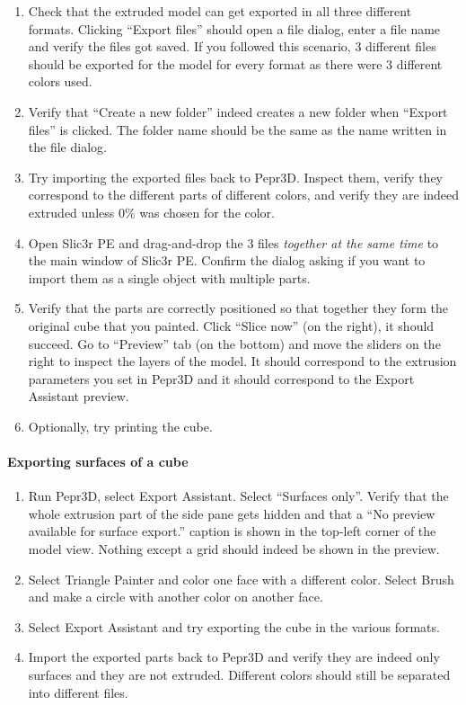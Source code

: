 \begin{enumerate}
\item Check that the extruded model can get exported in all three different formats. Clicking ``Export files'' should open a file dialog, enter a file name and verify the files got saved. If you followed this scenario, 3 different files should be exported for the model for every format as there were 3 different colors used.
\item Verify that ``Create a new folder'' indeed creates a new folder when ``Export files'' is clicked. The folder name should be the same as the name written in the file dialog.
\item Try importing the exported files back to Pepr3D. Inspect them, verify they correspond to the different parts of different colors, and verify they are indeed extruded unless $0\%$ was chosen for the color.
\item Open Slic3r PE and drag-and-drop the 3 files \emph{together at the same time} to the main window of Slic3r PE. Confirm the dialog asking if you want to import them as a single object with multiple parts.
\item Verify that the parts are correctly positioned so that together they form the original cube that you painted. Click ``Slice now'' (on the right), it should succeed. Go to ``Preview'' tab (on the bottom) and move the sliders on the right to inspect the layers of the model. It should correspond to the extrusion parameters you set in Pepr3D and it should correspond to the Export Assistant preview.
\item Optionally, try printing the cube.
\end{enumerate}

\paragraph{Exporting surfaces of a cube}

\begin{enumerate}
\item Run Pepr3D, select Export Assistant. Select ``Surfaces only''. Verify that the whole extrusion part of the side pane gets hidden and that a ``No preview available for surface export.'' caption is shown in the top-left corner of the model view. Nothing except a grid should indeed be shown in the preview.
\item Select Triangle Painter and color one face with a different color. Select Brush and make a circle with another color on another face.
\item Select Export Assistant and try exporting the cube in the various formats.
\item Import the exported parts back to Pepr3D and verify they are indeed only surfaces and they are not extruded. Different colors should still be separated into different files.
\end{enumerate}

